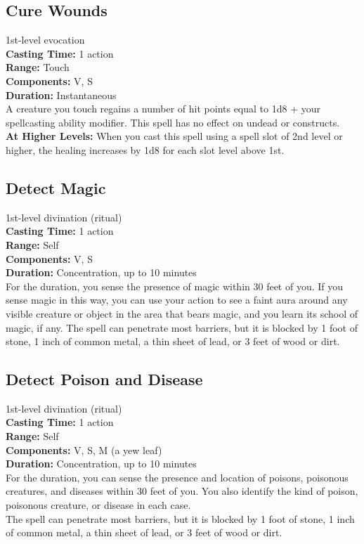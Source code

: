 \documentclass[11pt, A4paper, english]{article}
\begin{document}
		\subsection{Cure Wounds}
1st-level evocation \\
\textbf{Casting Time:} 1 action \\
\textbf{Range:} Touch \\
\textbf{Components:} V, S \\
\textbf{Duration:} Instantaneous \\
A creature you touch regains a number of hit points equal to 1d8 + your spellcasting ability modifier. This spell has no effect on undead or constructs. \\
\textbf{At Higher Levels:} When you cast this spell using a spell slot of 2nd level or higher, the healing increases by 1d8 for each slot level above 1st.

		\subsection{Detect Magic}
1st-level divination (ritual) \\
\textbf{Casting Time:} 1 action \\
\textbf{Range:} Self \\
\textbf{Components:} V, S \\
\textbf{Duration:} Concentration, up to 10 minutes \\
For the duration, you sense the presence of magic within 30 feet of you. If you sense magic in this way, you can use your action to see a faint aura around any visible creature or object in the area that bears magic, and you learn its school of magic, if any. The spell can penetrate most barriers, but it is blocked by 1  foot of stone, 1 inch of common metal, a thin sheet of lead, or 3 feet of wood or dirt.

		\subsection{Detect Poison and Disease}
1st-level divination (ritual) \\
\textbf{Casting Time:} 1 action \\
\textbf{Range:} Self \\
\textbf{Components:} V, S, M (a yew leaf) \\
\textbf{Duration:} Concentration, up to 10 minutes \\
For the duration, you can sense the presence and location of poisons, poisonous creatures, and diseases within 30 feet of you. You also identify the kind of poison, poisonous creature, or disease in each case. \\
The spell can penetrate most barriers, but it is blocked by 1 foot of stone, 1 inch of common metal, a thin sheet of lead, or 3 feet of wood or dirt.
\end{document}
